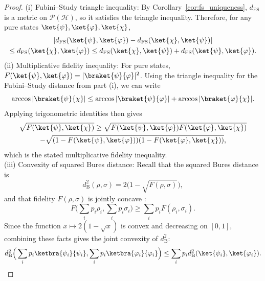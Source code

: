 \documentclass[aps,pra,reprint,nofootinbib,showpacs,superscriptaddress]{revtex4-1}
\newtheorem{theorem}{Theorem}[section]
\newcommand{\Hilbert}{\mathcal{H}}
\newcommand{\Proj}{\mathcal{P}}
\begin{document}
\begin{proof}
(i) {Fubini--Study triangle inequality:}  
By Corollary~\ref{cor:fs_uniqueness}, $d_{\mathrm{FS}}$ is a metric on $\Proj(\Hilbert)$, so it satisfies the triangle inequality.  
Therefore, for any pure states $\ket{\psi},\ket{\varphi},\ket{\chi}$,
\begin{multline}\notag
|d_{\mathrm{FS}}(\ket{\psi},\ket{\varphi}) - d_{\mathrm{FS}}(\ket{\chi},\ket{\psi})|
\\\le d_{\mathrm{FS}}(\ket{\chi},\ket{\varphi})
\le d_{\mathrm{FS}}(\ket{\chi},\ket{\psi}) + d_{\mathrm{FS}}(\ket{\psi},\ket{\varphi}).
\end{multline}
(ii) {Multiplicative fidelity inequality:}  
For pure states, $F(\ket{\psi},\ket{\varphi}) = |\braket{\psi}{\varphi}|^2$.  
Using the triangle inequality for the Fubini--Study distance from part (i), we can write
\[
\arccos|\braket{\psi}{\chi}| \le \arccos|\braket{\psi}{\varphi}| + \arccos|\braket{\varphi}{\chi}|.
\]
Applying trigonometric identities then gives
\begin{multline}\notag 
\sqrt{F(\ket{\psi},\ket{\chi})} \ge 
\sqrt{F(\ket{\psi},\ket{\varphi}) F(\ket{\varphi},\ket{\chi})} 
\\- \sqrt{(1-F(\ket{\psi},\ket{\varphi}))(1-F(\ket{\varphi},\ket{\chi}))},
\end{multline}
which is the stated multiplicative fidelity inequality.\\
(iii) {Convexity of squared Bures distance:}  
Recall that the squared Bures distance is
\[
d_{\mathrm{B}}^2(\rho,\sigma) = 2\big(1 - \sqrt{F(\rho,\sigma)}\big),
\]
and that fidelity $F(\rho,\sigma)$ is jointly concave \cite{uhlmann1976transition}:
\[
F\Big(\sum_i p_i \rho_i, \sum_i p_i \sigma_i\Big) \ge \sum_i p_i F(\rho_i,\sigma_i).
\]
Since the function $x \mapsto 2(1-\sqrt{x})$ is convex and decreasing on $[0,1]$, combining these facts gives the joint convexity of $d_{\mathrm{B}}^2$:
\[
d_{\mathrm{B}}^2\Big(\sum_i p_i \ketbra{\psi_i}{\psi_i}, \sum_i p_i \ketbra{\varphi_i}{\varphi_i}\Big) 
\le \sum_i p_i d_{\mathrm{B}}^2(\ket{\psi_i},\ket{\varphi_i}).
\]
\end{proof}



\end{document}
